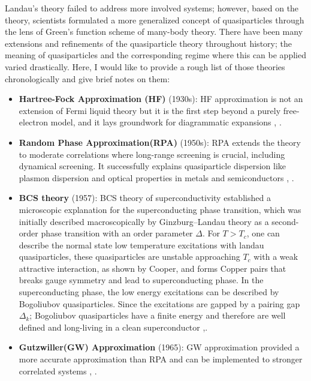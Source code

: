 Landau's theory failed to address more involved systems; however, based on the theory, scientists formulated a more generalized concept of quasiparticles through the lens of Green's function scheme of many-body theory. There have been many extensions and refinements of the quasiparticle theory throughout history; the meaning of quasiparticles and the corresponding regime where this can be applied varied drastically. Here, I would like to provide a rough list of those theories chronologically and give brief notes on them:
\begin{itemize}
	\item\textbf{Hartree-Fock Approximation (HF)} (1930s):
	HF approximation is not an extension of Fermi liquid theory but it is the first step beyond a purely free-electron model, and it lays groundwork for diagrammatic expansions \cite{fockNaeherungsmethodeZurLoesung1930}, \cite{slaterNoteHartreesMethod1930}.
	
	\item\textbf{Random Phase Approximation(RPA)} (1950s): 
	RPA extends the theory to moderate correlations where long-range screening is crucial, including dynamical screening. It successfully explains quasiparticle dispersion like plasmon dispersion and optical properties in metals and semiconductors \cite{bohmCollectiveDescriptionElectron1951}, \cite{nozieresCorrelationEnergyFree1958}.
	
	\item \textbf{BCS theory} (1957):
	BCS theory of superconductivity established a microscopic explanation for the superconducting phase transition, which was initially described macroscopically by Ginzburg–Landau theory as a second-order phase transition with an order parameter $\Delta$. For $T>T_c$, one can describe the normal state low temperature excitations with landau quasiparticles, these quasiparticles are unstable approaching $T_c$ with a weak attractive interaction, as shown by Cooper\cite{cooperBoundElectronPairs1956}, and forms Copper pairs that breaks gauge symmetry and lead to superconducting phase. In the superconducting phase, the low energy excitations can be described by Bogoliubov quasiparticles. Since the excitations are gapped by a pairing gap $\Delta_k$; Bogoliubov quasiparticles have a finite energy and therefore are well defined and long-living in a clean superconductor \cite{bardeenTheorySuperconductivity1957},\cite{tinkhamIntroductionSuperconductivity2004}.
 
	\item\textbf{Gutzwiller(GW) Approximation} (1965):
	GW approximation provided a more accurate approximation than RPA and can be implemented to stronger correlated systems \cite{hedinNewMethodCalculating1965}, \cite{aryasetiawanGWMethod1998}.
	

\end{itemize}
